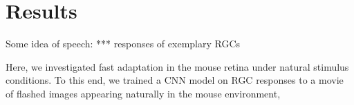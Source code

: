 \section{Results}
\label{sec:results}
Some idea of speech: *** responses of exemplary RGCs


Here, we investigated fast adaptation in the mouse retina under natural
stimulus conditions. To this end, we trained a CNN model on RGC responses
to a movie of flashed images appearing
naturally in the mouse environment, %
